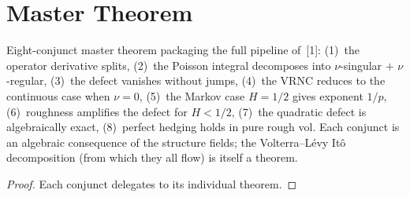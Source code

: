 \section{Master Theorem}

\begin{theorem}\label{thm:complete_volterra_levy_framework}
\leanok
{}
Eight-conjunct master theorem packaging the full pipeline of~[1]: (1)~the operator derivative splits, (2)~the Poisson integral decomposes into $\nu$-singular $+$ $\nu$-regular, (3)~the defect vanishes without jumps, (4)~the VRNC reduces to the continuous case when $\nu = 0$, (5)~the Markov case $H = 1/2$ gives exponent $1/p$, (6)~roughness amplifies the defect for $H < 1/2$, (7)~the quadratic defect is algebraically exact, (8)~perfect hedging holds in pure rough vol. Each conjunct is an algebraic consequence of the structure fields; the Volterra--L\'evy It\^o decomposition (from which they all flow) is itself a theorem.
\end{theorem}
\begin{proof}\leanok Each conjunct delegates to its individual theorem.\end{proof}
